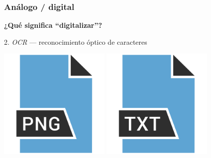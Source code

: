 \documentclass[%
  handout, %
  ]{beamer}
\newcommand{\Rojo}{\color[HTML]{8B0000}}
\newcommand*{\rojo}[1]{\textcolor[HTML]{8B0000}{#1}}
\newcommand*{\rojoit}[1]{\textit{\textcolor[HTML]{8B0000}{#1}}}
\newcommand{\Azul}{\color{bluenivaca}}
\begin{document}
\begin{frame}
  \frametitle{Análogo / digital}
  
  {\large\Azul\textbf{¿Qué significa \enquote{digitalizar}?}}

  \bigskip

  \rojo{2.} \rojoit{OCR} --- reconocimiento óptico de caracteres

  \begin{center}
    \includegraphics[width=0.4\textwidth]{img/image.png} %
    \quad%
    \raisebox{2cm}{{\Rojo\Huge$\Rightarrow$}}
    \quad%
    \includegraphics[width=0.4\textwidth]{img/text.png} %
    
  \end{center}

\end{frame}
\end{document}
